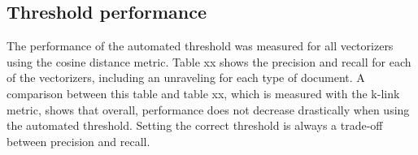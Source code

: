 \subsection{Threshold performance}
The performance of the automated threshold was measured for all vectorizers using the cosine distance metric. Table xx shows the precision and recall for each of the vectorizers, including an unraveling for each type of document. A comparison between this table and table xx, which is measured with the k-link metric, shows that overall, performance does not decrease drastically when using the automated threshold. Setting the correct threshold is always a trade-off between precision and recall. 

